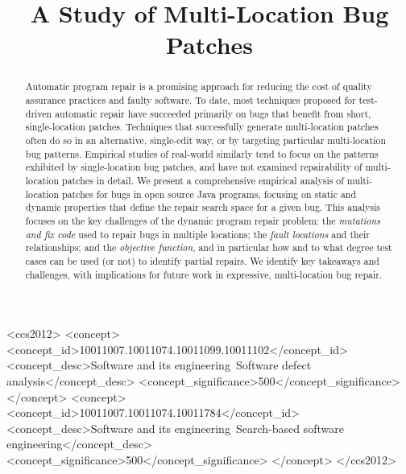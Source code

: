 \documentclass[sigconf, timestamp-false, anonymous=true]{acmart}
\title{A Study of Multi-Location Bug Patches}
\begin{document}

\begin{abstract}
    Automatic program repair is a promising approach for reducing the
    cost of quality assurance practices and faulty software. To date, most
    techniques proposed for test-driven automatic repair have succeeded
    primarily on bugs that benefit from short, single-location patches. Techniques
    that successfully generate multi-location patches often do so in an
    alternative, single-edit way, or by targeting particular multi-location bug
    patterns. Empirical studies of real-world similarly tend to focus on the
    patterns exhibited by single-location bug patches, and have not examined repairability
    of multi-location patches in detail. We present a comprehensive empirical analysis
    of multi-location patches for bugs in open source Java programs, focusing on static and
    dynamic properties that define the repair search space for a given bug.
    This analysis focuses on the key challenges of the dynamic program repair
    problem: the \emph{mutations and fix code} used to repair bugs in multiple locations;
    the \emph{fault locations} and their relationships; and the \emph{objective
      function}, and in particular how and to what degree test cases can be used
    (or not) to identify partial repairs. We identify key takeaways and
    challenges, with implications for future work in expressive, multi-location bug
    repair.
\end{abstract}

\begin{CCSXML}
<ccs2012>
<concept>
<concept_id>10011007.10011074.10011099.10011102</concept_id>
<concept_desc>Software and its engineering~Software defect analysis</concept_desc>
<concept_significance>500</concept_significance>
</concept>
<concept>
<concept_id>10011007.10011074.10011784</concept_id>
<concept_desc>Software and its engineering~Search-based software engineering</concept_desc>
<concept_significance>500</concept_significance>
</concept>
</ccs2012>
\end{CCSXML}


\end{document}
